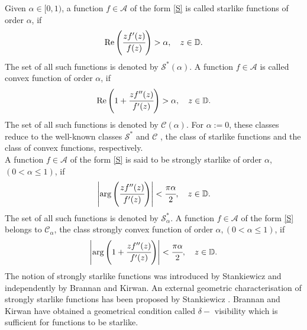 \documentclass[a4paper,12pt]{amsart}
\theoremstyle{definition}
\numberwithin{equation}{section}
\begin{document}
\noindent  Given $\alpha \in [0,1)$, a function $f \in \mathcal{A}$  of the form \eqref{S} is called starlike functions
of order $\alpha$, if 
\begin{equation}\label{staralpha}
{\rm Re} \left( \cfrac{zf'(z)}{f(z)}\right)> \alpha, \quad z \in \mathbb{D}.
\end{equation}
The set of all such functions is denoted by $\mathcal{S}^*(\alpha)$. A function $f \in \mathcal{A}$ is called convex function of order $\alpha$, if
\begin{equation}\label{starconvex}
{\rm Re} \left( 1+\cfrac{zf''(z)}{f'(z)}\right)> \alpha, \quad z \in \mathbb{D}.
\end{equation}
The set of all such functions is denoted by $\mathcal{C}(\alpha)$. For $\alpha := 0$, these classes reduce to the well-known classes $\mathcal{S}^*$ and $\mathcal{C}$ , the class
of starlike functions and the class of convex functions, respectively.\\[2mm]
\noindent  A function $f \in \mathcal{A}$ of the form \eqref{S} is said to be strongly starlike of order $\alpha$,\, $(0 < \alpha \leq 1)$, if
\begin{equation}\label{stardef}
\left|\text{arg} \left(\cfrac{zf''(z)}{f'(z)}\right)\right|< \cfrac{\pi \alpha}{2}, \quad z \in \mathbb{D}.
\end{equation}
The set of all such functions is denoted by $\mathcal{S}^*_{\alpha}$.
\noindent A function $f \in \mathcal{A}$ of the form \eqref{S} belongs to $\mathcal{C}_{\alpha}$, the class strongly convex function of order $\alpha$,\,$(0 < \alpha \leq 1)$, if
\begin{equation}\label{convexdef}
\left|\text{arg} \left(1+\cfrac{zf''(z)}{f'(z)}\right)\right|< \cfrac{\pi \alpha}{2}, \quad z \in \mathbb{D}.
\end{equation}
\noindent The notion of strongly starlike functions was introduced by Stankiewicz \cite{Stankiewicz1} and independently by Brannan and Kirwan\cite{Brannan}. An external geometric characterisation of strongly starlike functions has been proposed by Stankiewicz \cite{Stankiewicz2}. Brannan and Kirwan\cite{Brannan} have obtained  a geometrical condition called $\delta-$ visibility which is sufficient for functions to be starlike.\\
\end{document}
